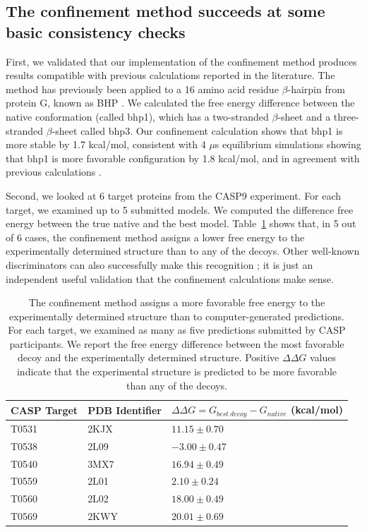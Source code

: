 \documentclass[12pt]{article}
\begin{document}
\subsection{The confinement method succeeds at some basic consistency checks}

First, we validated that our implementation of the confinement method produces results compatible with previous calculations reported in the 
literature.  The method has previously been applied to a 16 amino acid residue $\beta$-hairpin from protein G, known as 
BHP \cite{Cecchini2009}. We calculated the free energy difference between the native conformation (called bhp1), which has 
a two-stranded $\beta$-sheet and a three-stranded $\beta$-sheet called bhp3.  Our confinement calculation shows that bhp1 
is more stable by 1.7 kcal/mol, consistent with 4 $\mu$s equilibrium simulations showing that bhp1 is more favorable configuration 
by 1.8 kcal/mol, and in agreement with previous calculations \cite{Cecchini2009}.

Second, we looked at 6 target proteins from the CASP9 experiment.  For each target, we examined up to 5 submitted models.  We 
computed the difference free energy between the true native and the best model.  Table~\ref{table:casp_control} shows that, in 5 
out of 6 cases, the confinement method assigns a lower free energy to the experimentally determined structure than to any of the 
decoys.  Other well-known discriminators  can also successfully make this recognition \cite{Sheffler2009}; 
 it is just an independent useful validation that the confinement calculations make sense. 

\begin{table}
\begin{center}
\caption{The confinement method assigns a more favorable free energy to the experimentally
    determined structure than to computer-generated predictions. For each target, we examined as
    many as five predictions submitted by CASP participants. We report the free energy difference
    between the most favorable decoy and the experimentally determined structure. Positive
    $\Delta\Delta G$ values indicate that the experimental structure is predicted to be more
favorable than any of the decoys.}
\label{table:casp_control}
\begin{tabular}{l l l}\hline
    CASP Target  & PDB Identifier & $\Delta \Delta G = G_{best~decoy} - G_{native}$ (kcal/mol) \\ \hline
     T0531       &    2KJX        &          $11.15 \pm 0.70$ \\ \hline
     T0538       &    2L09        &          $-3.00 \pm 0.47$ \\ \hline
     T0540       &    3MX7        &          $16.94 \pm 0.49$ \\ \hline
     T0559       &    2L01        &          $2.10 \pm 0.24$ \\ \hline
     T0560       &    2L02        &          $18.00 \pm 0.49$ \\ \hline
     T0569       &    2KWY        &          $20.01 \pm 0.69$  \\ \hline
\end{tabular}
\end{center}
\end{table}
\end{document}
